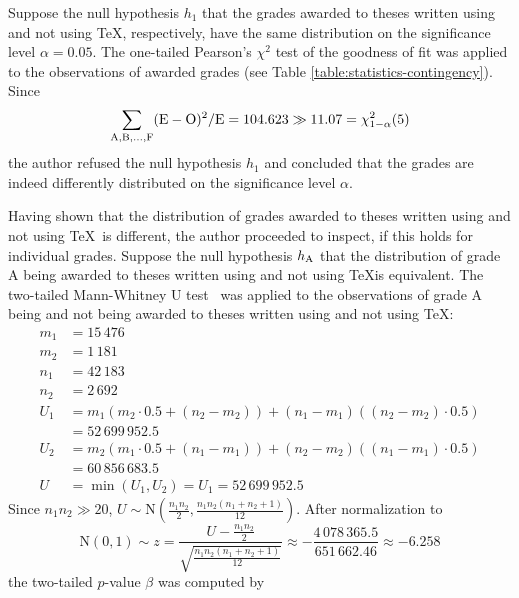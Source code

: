 \documentclass{csbulletin}
\begin{document}
{  Suppose the null hypothesis $h_1$ that the grades awarded
  to theses written using and not using \TeX, respectively,
  have the same distribution on the significance level
  $\alpha=0.05$. The one-tailed Pearson's $\chi^2$ test
  \cite{Pearson00} of the goodness of fit was applied to the
  observations of awarded grades (see Table
  \ref{table:statistics-contingency}). Since \begin{equation}
    \sum_{\rm{A},\rm{B},\ldots,\rm{F}}
    (\rm{E}-\rm{O})^2/\rm{E}=104.623\gg11.07=
    \chi_{1-\alpha}^2(5)
  \end{equation} the author refused the null hypothesis $h_1$
  and concluded that the grades are indeed differently
  distributed on the significance level $\alpha$.

  Having shown that the distribution of grades awarded to theses
  written using and not using \TeX\ is different, the author
  proceeded to inspect, if this holds for individual grades.
  Suppose the null hypothesis $h_{\rm{A}}$ that the
  distribution of grade A being awarded to theses written using
  and not using \TeX is equivalent. The two-tailed
  Mann-Whitney U test~\cite{mann47} was applied to the
  observations of grade A being and not being awarded to theses
  written using and not using \TeX: \begin{align}
    \tag{Without \TeX\ (grade A)} m_1 &= 15\,476 \\
    \tag{With \TeX\ (grade A)}    m_2 &= 1\,181  \\
    \tag{Without \TeX\ (total)} n_1 &= 42\,183 \\
    \tag{With \TeX\ (total)}    n_2 &= 2\,692  \\
    U_1 &=  m_1(m_2\cdot0.5+(n_2-m_2))+
                  (n_1-m_1)((n_2-m_2)\cdot0.5) \\
      \nonumber&=52\,699\,952.5 \\
    U_2 &=  m_2(m_1\cdot0.5+(n_1-m_1))+
                  (n_2-m_2)((n_1-m_1)\cdot0.5) \\
      \nonumber&=60\,856\,683.5 \\
    U &= \min(U_1,U_2) = U_1 = 52\,699\,952.5
  \end{align} Since $n_1n_2\gg20$,
  $U\sim\text{N}\left(\frac{n_1n_2}2,
  \frac{n_1n_2(n_1+n_2+1)}{12}\right)$. After normalization to
  \begin{equation}
    \text{N}(0,1)\sim z =
    \frac{U-\frac{n_1n_2}2}{\sqrt{\frac{n_1n_2(n_1+n_2+1)}{12}}}
    \approx-\frac{4\,078\,365.5}{651\,662.46}\approx-6.258
  \end{equation} the two-tailed $p$-value $\beta$ was computed by
}
\end{document}
